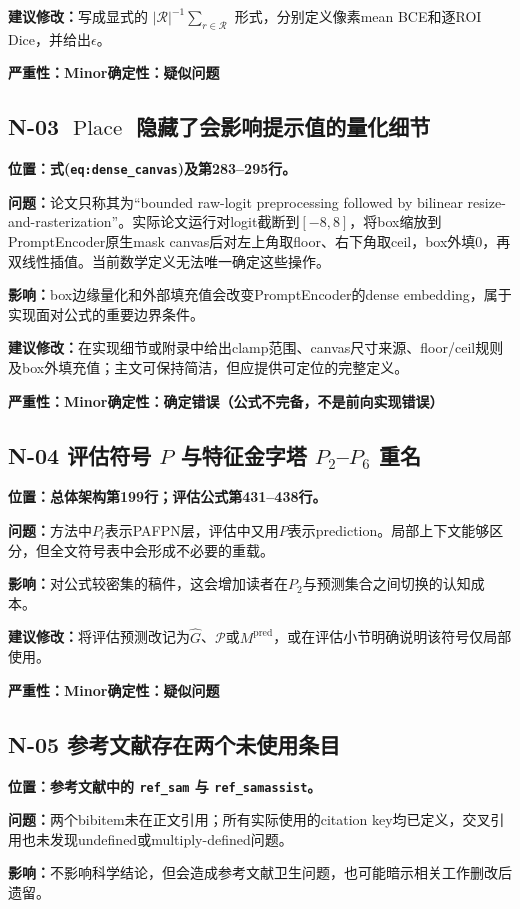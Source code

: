 \documentclass[UTF8,a4paper,11pt]{ctexart}
\newcommand{\sev}[1]{\textbf{严重性：#1}}
\newcommand{\cert}[1]{\textbf{确定性：#1}}
\newcommand{\loc}[1]{\textbf{位置：#1}}
\newcommand{\prob}{\textbf{问题：}}
\newcommand{\impact}{\textbf{影响：}}
\newcommand{\fix}{\textbf{建议修改：}}
\begin{document}
\fix 写成显式的 $|\mathcal R|^{-1}\sum_{r\in\mathcal R}$ 形式，分别定义像素mean BCE和逐ROI Dice，并给出$\epsilon$。

\sev{Minor}\quad \cert{疑似问题}

\subsection*{N-03 $\operatorname{Place}$ 隐藏了会影响提示值的量化细节}
\loc{式(\texttt{eq:dense\_canvas})及第283--295行。}

\prob 论文只称其为“bounded raw-logit preprocessing followed by bilinear resize-and-rasterization”。实际论文运行对logit截断到$[-8,8]$，将box缩放到PromptEncoder原生mask canvas后对左上角取floor、右下角取ceil，box外填0，再双线性插值。当前数学定义无法唯一确定这些操作。

\impact box边缘量化和外部填充值会改变PromptEncoder的dense embedding，属于实现面对公式的重要边界条件。

\fix 在实现细节或附录中给出clamp范围、canvas尺寸来源、floor/ceil规则及box外填充值；主文可保持简洁，但应提供可定位的完整定义。

\sev{Minor}\quad \cert{确定错误（公式不完备，不是前向实现错误）}

\subsection*{N-04 评估符号 $P$ 与特征金字塔 $P_2$--$P_6$ 重名}
\loc{总体架构第199行；评估公式第431--438行。}

\prob 方法中$P_l$表示PAFPN层，评估中又用$P$表示prediction。局部上下文能够区分，但全文符号表中会形成不必要的重载。

\impact 对公式较密集的稿件，这会增加读者在$P_2$与预测集合之间切换的认知成本。

\fix 将评估预测改记为$\widehat G$、$\mathcal P$或$M^{\mathrm{pred}}$，或在评估小节明确说明该符号仅局部使用。

\sev{Minor}\quad \cert{疑似问题}

\subsection*{N-05 参考文献存在两个未使用条目}
\loc{参考文献中的 \texttt{ref\_sam} 与 \texttt{ref\_samassist}。}

\prob 两个bibitem未在正文引用；所有实际使用的citation key均已定义，交叉引用也未发现undefined或multiply-defined问题。

\impact 不影响科学结论，但会造成参考文献卫生问题，也可能暗示相关工作删改后遗留。
\end{document}
